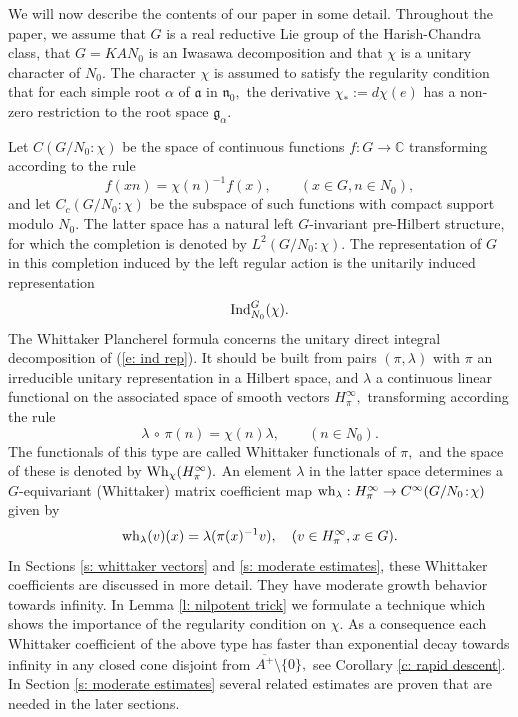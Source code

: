 \documentclass[12pt,a4paper]{article}
\def\qquad{\quad\quad}
\def\msy#1{{\mathbb #1}}
\def\C{{\msy C}}
\def\ga{\alpha}
\def\gl{\lambda}
\def\got#1{\mathfrak #1}
\def\fa{{\got a}}
\def\fg{{\got g}}
\def\fn{{\got n}}
\def\to{\rightarrow}
\def\after{\,{\scriptstyle\circ}\,}
\numberwithin{Thm}{section}
\numberwithin{equation}{section}
\def\Ind{{\rm Ind}}
\def\Wh{{\rm Wh}}
\numberwithin{equation}{section}
\def\wh{{\rm wh}}
\def\col{\!:\!}
\def\cchi{\chi}
\begin{document}
We will now describe the contents of our paper in some detail. Throughout the paper, we assume that $G$ is a real reductive Lie group 
of the Harish-Chandra class, that $G = KAN_0$ is an Iwasawa decomposition and that $\cchi$ is a unitary 
character of $N_0.$ The character $\cchi$ is assumed to satisfy the regularity condition that for each simple root $\ga$ of $\fa$ in $\fn_0,$ 
the derivative $\cchi_*:= d\cchi(e)$ has a non-zero restriction to the root space $\fg_\ga.$  

Let 
$
C(G/N_0\col \cchi)$ be the space of continuous functions $f: G \to \C$ 
 transforming according to the rule
$$
f(xn) = \cchi(n)^{-1} f(x), \qquad (x \in G, n \in N_0),
$$%
and let $C_c(G/N_0\col \cchi)$ 
be the subspace of such functions with compact support modulo $N_0.$ The latter 
space has a natural left $G$-invariant pre-Hilbert structure, for which the completion
is denoted by $L^2(G/N_0\col \cchi).$ The representation of $G$ in this completion induced by the left regular action is the unitarily induced representation
\begin{equation}
\label{e: ind rep}
\Ind_{N_0}^G(\cchi).
\end{equation}
The Whittaker Plancherel formula 
concerns the unitary direct integral decomposition of (\ref{e: ind rep}).  It should be built from pairs $(\pi, \gl)$ 
with $\pi$ an irreducible unitary representation in a Hilbert space, and 
$\gl$ a continuous linear functional 
on the associated space of smooth vectors $H_\pi^\infty,$ transforming according the rule
$$
\gl \after \pi(n) = \cchi(n) \gl,\qquad (n\in N_0).
$$%
The functionals of this type are called 
Whittaker functionals of $\pi,$ and the space of these is denoted by $\Wh_\cchi(H_\pi^\infty).$ 
An element $\gl $ in the latter space determines a $G$-equivariant (Whittaker) matrix coefficient map 
$\wh_\gl: H_\pi^\infty \to C^\infty(G/N_0\col \cchi)$ given by 
$$ 
\wh_\gl(v)(x) = \gl(\pi(x)^{-1} v),\quad (v \in H_\pi^\infty , x \in G).
$$%
In Sections \ref{s: whittaker vectors} 
and \ref{s: moderate estimates}, these Whittaker coefficients are discussed in more detail. They  
have moderate growth behavior towards infinity. In Lemma \ref{l: nilpotent trick}
we formulate a  technique which shows the importance of the regularity condition 
on $\cchi.$ As a consequence each Whittaker coefficient of the above type has
faster than exponential decay towards infinity in any closed cone disjoint from 
$\overline{ A^+}\setminus \{0\},$ see Corollary \ref{c: rapid descent}. In Section \ref{s: moderate estimates}  several related estimates are proven that are needed 
in the later sections.
\end{document}

